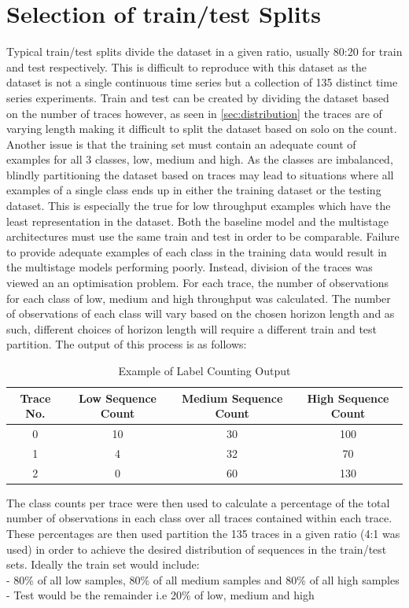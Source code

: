 \section{Selection of train/test Splits}
Typical train/test splits divide the dataset in a given ratio, usually 80:20 for train and test respectively. This is difficult to reproduce with this dataset as the dataset is not a single continuous time series but a collection of 135 distinct time series experiments. Train and test can be created by dividing the dataset based on the number of traces however, as seen in \ref{sec:distribution} the traces are of varying length making it difficult to split the dataset based on solo on the count. Another issue is that the training set must contain an adequate count of examples for all 3 classes, low, medium and high. As the classes are imbalanced, blindly partitioning the dataset based on traces may lead to situations where all examples of a single class ends up in either the training dataset or the testing dataset. This is especially the true for low throughput examples which have the least representation in the dataset. Both the baseline model and the multistage architectures must use the same train and test in order to be comparable. Failure to provide adequate examples of each class in the training data would result in the multistage models performing poorly. Instead, division of the traces was viewed an an optimisation problem. For each trace, the number of observations for each class of low, medium and high throughput was calculated. The number of observations of each class will vary based on the chosen horizon length and as such, different choices of horizon length will require a different train and test partition. The output of this process is as follows:
\begin{table}[!htb]
  \centering
  \caption{Example of Label Counting Output}
  \begin{tabular}{|c|c|c|c|}
    \hline
    Trace No. & Low Sequence Count & Medium Sequence Count & High Sequence Count \\
    \hline
    0 & 10 & 30 & 100 \\
    1 & 4 & 32 & 70\\
    2  & 0 & 60 & 130\\
    \hline
  \end{tabular}
\end{table}
The class counts per trace were then used to calculate a percentage of the total number of observations in each class over all traces contained within each trace. These percentages are then used partition the 135 traces in a given ratio (4:1 was used) in order to achieve the desired distribution of sequences in the train/test sets. Ideally the train set would include: \\
- 80\% of all low samples, 80\% of all medium samples and 80\% of all high samples \\
- Test would be the remainder i.e 20\% of low, medium and high \\

